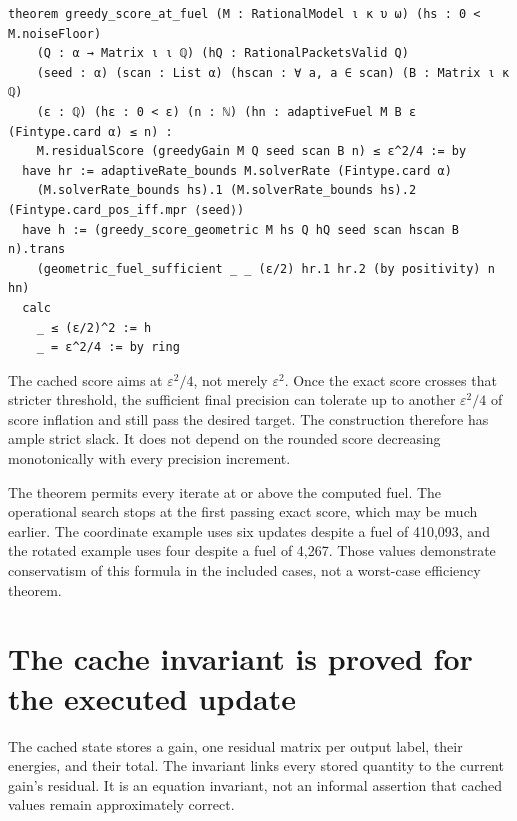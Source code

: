 \documentclass[11pt]{article}\usepackage{needspace}\renewcommand{\paperkind}{Lean companion}\setlength{\parskip}{0.35em}
\begin{document}
\begin{lstlisting}[style=BayesSource]
theorem greedy_score_at_fuel (M : RationalModel ι κ υ ω) (hs : 0 < M.noiseFloor)
    (Q : α → Matrix ι ι ℚ) (hQ : RationalPacketsValid Q)
    (seed : α) (scan : List α) (hscan : ∀ a, a ∈ scan) (B : Matrix ι κ ℚ)
    (ε : ℚ) (hε : 0 < ε) (n : ℕ) (hn : adaptiveFuel M B ε (Fintype.card α) ≤ n) :
    M.residualScore (greedyGain M Q seed scan B n) ≤ ε^2/4 := by
  have hr := adaptiveRate_bounds M.solverRate (Fintype.card α)
    (M.solverRate_bounds hs).1 (M.solverRate_bounds hs).2 (Fintype.card_pos_iff.mpr ⟨seed⟩)
  have h := (greedy_score_geometric M hs Q hQ seed scan hscan B n).trans
    (geometric_fuel_sufficient _ _ (ε/2) hr.1 hr.2 (by positivity) n hn)
  calc
    _ ≤ (ε/2)^2 := h
    _ = ε^2/4 := by ring
\end{lstlisting}

The cached score aims at $\varepsilon^2/4$, not merely $\varepsilon^2$. Once the exact score crosses that stricter threshold, the sufficient final precision can tolerate up to another $\varepsilon^2/4$ of score inflation and still pass the desired target. The construction therefore has ample strict slack. It does not depend on the rounded score decreasing monotonically with every precision increment.

The theorem permits every iterate at or above the computed fuel. The operational search stops at the first passing exact score, which may be much earlier. The coordinate example uses six updates despite a fuel of 410,093, and the rotated example uses four despite a fuel of 4,267. Those values demonstrate conservatism of this formula in the included cases, not a worst-case efficiency theorem.

\section{The cache invariant is proved for the executed update}

The cached state stores a gain, one residual matrix per output label, their energies, and their total. The invariant links every stored quantity to the current gain's residual. It is an equation invariant, not an informal assertion that cached values remain approximately correct.


\end{document}
